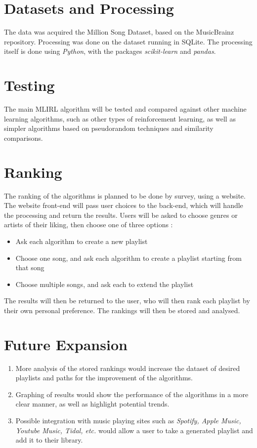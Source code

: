 \documentclass[a4paper, 12pt]{article}
\begin{document}
\section{Datasets and Processing}
The data was acquired the Million Song Dataset, based on the MusicBrainz repository.
Processing was done on the dataset running in SQLite.
The processing itself is done using \emph{Python}, with the packages \emph{scikit-learn} and \emph{pandas}.

\section{Testing}
The main MLIRL algorithm will be tested and compared against other machine learning algorithms, such as other types of reinforcement learning, as well as simpler algorithms based on pseudorandom techniques and similarity comparisons.

\section{Ranking}
The ranking of the algorithms is planned to be done by survey, using a website. The website front-end will pass user choices to the back-end, which will handle the processing and return the results. Users will be asked to choose genres or artists of their liking, then choose one of three options :
\begin{itemize}
    \item{Ask each algorithm to create a new playlist}
    \item{Choose one song, and ask each algorithm to create a playlist starting from that song}
    \item{Choose multiple songs, and ask each to extend the playlist}
\end{itemize}

The results will then be returned to the user, who will then rank each playlist by their own personal preference.
The rankings will then be stored and analysed.

\section{Future Expansion}
\begin{enumerate}
    \item More analysis of the stored rankings would increase the dataset of desired playlists and paths for the improvement of the algorithms.
    \item Graphing of results would show the performance of the algorithms in a more clear manner, as well as highlight potential trends.
    \item Possible integration with music playing sites such as \textit{Spotify, Apple Music, Youtube Music, Tidal, etc.} would allow a user to take a generated playlist and add it to their library.
\end{enumerate}
\end{document}

